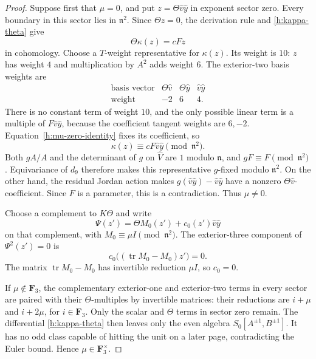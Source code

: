 \documentclass[11pt]{article}
\theoremstyle{definition}
\theoremstyle{remark}
\numberwithin{equation}{section}
\begin{document}
\begin{proof}
Suppose first that $\mu=0$, and put
$z=\Theta\hat v\hat y$ in exponent sector zero. Every boundary in
this sector lies in $\mathfrak n^2$. Since $\Theta z=0$, the
derivation rule and \eqref{h:kappa-theta} give
\begin{equation}
 \label{h:mu-zero-identity}
 \Theta\kappa(z)=cFz
\end{equation}
in cohomology. Choose a $T$-weight representative for $\kappa(z)$.
Its weight is $10$: $z$ has weight $4$ and multiplication by $A^2$
adds weight $6$. The exterior-two basis weights are
\[
 \begin{array}{c|ccc}
  \text{basis vector}&\Theta\hat v&\Theta\hat y&\hat v\hat y\\
  \text{weight}&-2&6&4.
 \end{array}
\]
There is no constant term of weight $10$, and the only possible linear
term is a multiple of $F\hat v\hat y$, because the coefficient tangent
weights are $6,-2$. Equation~\eqref{h:mu-zero-identity} fixes its
coefficient, so
\[
 \kappa(z)\equiv cF\hat v\hat y\pmod{\mathfrak n^2}.
\]
Both $gA/A$ and the determinant of $g$ on $\widehat V$ are $1$ modulo
$\mathfrak n$, and $gF\equiv F\pmod{\mathfrak n^2}$.
Equivariance of $d_9$ therefore makes this representative $g$-fixed
modulo $\mathfrak n^2$. On the other hand, the residual Jordan action
makes $g(\hat v\hat y)-\hat v\hat y$ have a nonzero
$\Theta\hat v$-coefficient. Since $F$ is a parameter, this is a
contradiction. Thus $\mu\ne0$.

Choose a complement to $K\Theta$ and write
\[
 \Psi(z')=\Theta M_0(z')+c_0(z')\hat v\hat y
\]
on that complement, with $M_0\equiv\mu I\pmod{\mathfrak n^2}$.
The exterior-three component of $\Psi^2(z')=0$ is
\[
 c_0\bigl((\operatorname{tr}M_0-M_0)z'\bigr)=0.
\]
The matrix $\operatorname{tr}M_0-M_0$ has invertible reduction
$\mu I$, so $c_0=0$.

If $\mu\notin\mathbf F_3$, the complementary exterior-one and
exterior-two terms in every sector are paired with their
$\Theta$-multiples by invertible matrices: their reductions are
$i+\mu$ and $i+2\mu$, for $i\in\mathbf F_3$. Only the scalar and
$\Theta$ terms in sector zero remain. The differential
\eqref{h:kappa-theta} then leaves only the even algebra
$S_0[A^{\pm1},B^{\pm1}]$. It has no odd class capable of hitting the
unit on a later page, contradicting the Euler bound. Hence
$\mu\in\mathbf F_3^{\times}$.


\end{proof}
\end{document}
